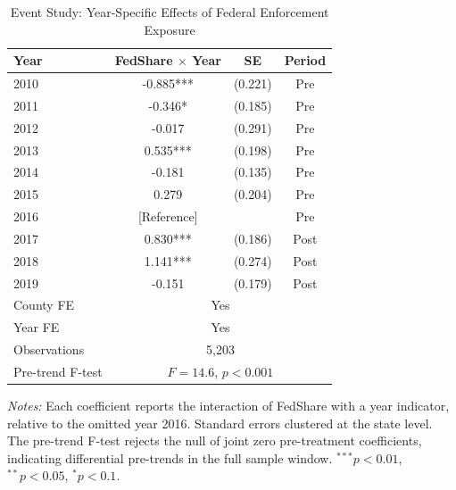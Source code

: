 \begin{table}[htbp]
\centering
\caption{Event Study: Year-Specific Effects of Federal Enforcement Exposure}
\label{tab:eventstudy}
\begin{tabular}{lccc}
\toprule
Year & FedShare $\times$ Year & SE & Period \\
\midrule
2010 & -0.885*** & (0.221) & Pre \\
2011 & -0.346* & (0.185) & Pre \\
2012 & -0.017 & (0.291) & Pre \\
2013 & 0.535*** & (0.198) & Pre \\
2014 & -0.181 & (0.135) & Pre \\
2015 & 0.279 & (0.204) & Pre \\
2016 & [Reference] & & Pre \\
2017 & 0.830*** & (0.186) & Post \\
2018 & 1.141*** & (0.274) & Post \\
2019 & -0.151 & (0.179) & Post \\
\midrule
County FE & \multicolumn{3}{c}{Yes} \\
Year FE & \multicolumn{3}{c}{Yes} \\
Observations & \multicolumn{3}{c}{5,203} \\
Pre-trend F-test & \multicolumn{3}{c}{$F = 14.6$, $p < 0.001$} \\
\bottomrule
\end{tabular}
\par\vspace{4pt}\begin{minipage}{\textwidth}\footnotesize
\textit{Notes:} Each coefficient reports the interaction of FedShare with a year indicator, relative to the omitted year 2016. Standard errors clustered at the state level. The pre-trend F-test rejects the null of joint zero pre-treatment coefficients, indicating differential pre-trends in the full sample window. $^{***}p<0.01$, $^{**}p<0.05$, $^{*}p<0.1$.
\end{minipage}
\end{table}
